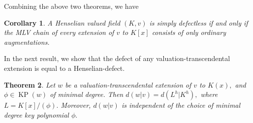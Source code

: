 \documentclass[11pt]{amsart}
\newtheorem{theorem}{Theorem}[section]
\newtheorem{corollary}[theorem]{Corollary}
\theoremstyle{definition}
\theoremstyle{remark}
\numberwithin{equation}{section}
\begin{document}
	Combining the above two theorems, we have
	\begin{corollary}
	A Henselian valued field $(K,v)$ is simply defectless if and only if the MLV chain of every extension of $v$ to $K[x]$ consists of only ordinary augmentations.
	\end{corollary}

	 In the next result, we show that the defect of any valuation-transcendental extension is equal to a Henselian-defect.
		
		\begin{theorem}\label{odt2}
			Let $w$ be a valuation-transcendental extension of $v$ to $K(x),$ and $\phi\in \operatorname{KP}(w)$ of minimal degree. Then $d(w|v)=d(L^h|K^h),$ where $L=K[x]/(\phi).$ 
			Moreover, $d(w|v)$ is independent of the choice of minimal degree key polynomial $\phi.$
		\end{theorem}
\end{document}
